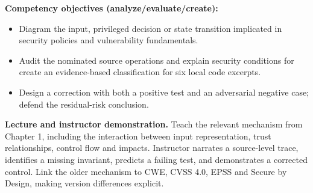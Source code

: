 \documentclass[10pt,letterpaper]{article}
\begin{document}
\textbf{Competency objectives (analyze/evaluate/create):}
\begin{itemize}[leftmargin=*,itemsep=2pt]
\item Diagram the input, privileged decision or state transition implicated in security policies and vulnerability fundamentals.
\item Audit the nominated source operations and explain security conditions for create an evidence-based classification for six local code excerpts.
\item Design a correction with both a positive test and an adversarial negative case; defend the residual-risk conclusion.
\end{itemize}
\textbf{Lecture and instructor demonstration.} Teach the relevant mechanism from Chapter 1, including the interaction between input representation, trust relationships, control flow and impacts. Instructor narrates a source-level trace, identifies a missing invariant, predicts a failing test, and demonstrates a corrected control. Link the older mechanism to CWE, CVSS 4.0, EPSS and Secure by Design, making version differences explicit.
\end{document}
